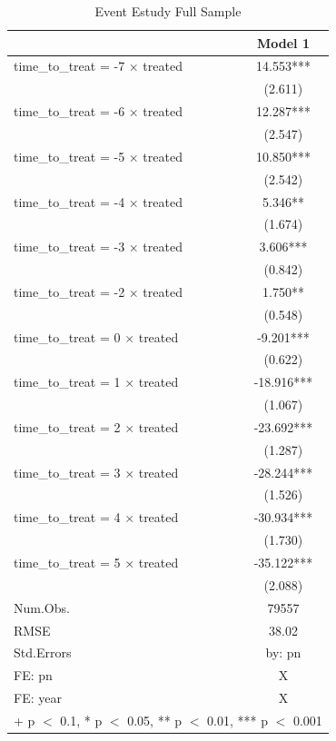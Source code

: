 \documentclass[
  12pt,
]{article}
\begin{document}
\begin{table}

\caption{\label{tab:Tab-4}Event Estudy Full Sample}
\centering
\begin{tabular}[t]{lc}
\toprule
  & Model 1\\
\midrule
time\_to\_treat = -7 × treated & 14.553***\\
 & (2.611)\\
time\_to\_treat = -6 × treated & 12.287***\\
 & (2.547)\\
time\_to\_treat = -5 × treated & 10.850***\\
 & (2.542)\\
time\_to\_treat = -4 × treated & 5.346**\\
 & (1.674)\\
time\_to\_treat = -3 × treated & 3.606***\\
 & (0.842)\\
time\_to\_treat = -2 × treated & 1.750**\\
 & (0.548)\\
time\_to\_treat = 0 × treated & -9.201***\\
 & (0.622)\\
time\_to\_treat = 1 × treated & -18.916***\\
 & (1.067)\\
time\_to\_treat = 2 × treated & -23.692***\\
 & (1.287)\\
time\_to\_treat = 3 × treated & -28.244***\\
 & (1.526)\\
time\_to\_treat = 4 × treated & -30.934***\\
 & (1.730)\\
time\_to\_treat = 5 × treated & -35.122***\\
 & (2.088)\\
\midrule
Num.Obs. & 79557\\
RMSE & 38.02\\
Std.Errors & by: pn\\
FE: pn & X\\
FE: year & X\\
\bottomrule
\multicolumn{2}{l}{\rule{0pt}{1em}+ p $<$ 0.1, * p $<$ 0.05, ** p $<$ 0.01, *** p $<$ 0.001}\\
\end{tabular}
\end{table}
\end{document}
